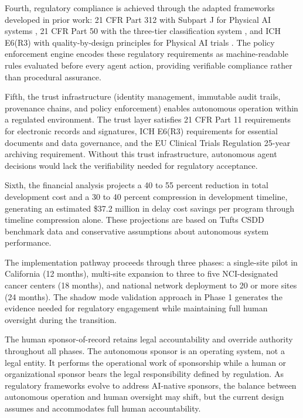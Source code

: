 Fourth, regulatory compliance is achieved through the adapted frameworks developed in prior
work: 21 CFR Part 312 with Subpart J for Physical AI systems \cite{cfr312-adapt}, 21 CFR
Part 50 with the three-tier classification system \cite{cfr50-adapt}, and ICH E6(R3) with
quality-by-design principles for Physical AI trials \cite{ich-adapt}. The policy enforcement
engine encodes these regulatory requirements as machine-readable rules evaluated before
every agent action, providing verifiable compliance rather than procedural assurance.

Fifth, the trust infrastructure (identity management, immutable audit trails, provenance
chains, and policy enforcement) enables autonomous operation within a regulated environment.
The trust layer satisfies 21 CFR Part 11 \cite{cfr-part-11} requirements for electronic
records and signatures, ICH E6(R3) requirements for essential documents and data governance,
and the EU Clinical Trials Regulation \cite{eu-ctr} 25-year archiving requirement. Without
this trust infrastructure, autonomous agent decisions would lack the verifiability needed
for regulatory acceptance.

Sixth, the financial analysis projects a 40 to 55 percent reduction in total development
cost and a 30 to 40 percent compression in development timeline, generating an estimated
\$37.2 million in delay cost savings per program through timeline compression alone. These
projections are based on Tufts CSDD benchmark data \cite{tufts-csdd-cost, tufts-delay,
tufts-timeline} and conservative assumptions about autonomous system performance.

The implementation pathway proceeds through three phases: a single-site pilot in California
(12 months), multi-site expansion to three to five NCI-designated cancer centers (18 months),
and national network deployment to 20 or more sites (24 months). The shadow mode validation
approach in Phase 1 generates the evidence needed for regulatory engagement while
maintaining full human oversight during the transition.

The human sponsor-of-record retains legal accountability and override authority throughout
all phases. The autonomous sponsor is an operating system, not a legal entity. It performs
the operational work of sponsorship while a human or organizational sponsor bears the legal
responsibility defined by regulation. As regulatory frameworks evolve to address AI-native
sponsors, the balance between autonomous operation and human oversight may shift, but the
current design assumes and accommodates full human accountability.

